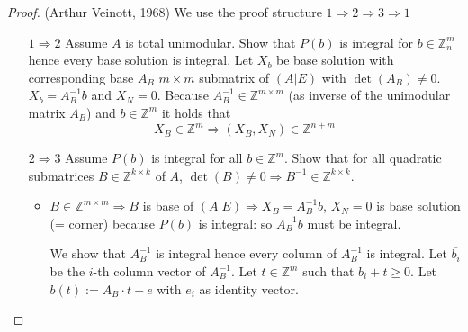 \documentclass[a4paper]{article}
\theoremstyle{definition}
\begin{document}
\begin{proof}
  (Arthur Veinott, 1968)
  We use the proof structure $1 \Rightarrow 2 \Rightarrow 3 \Rightarrow 1$

  \begin{itemize}
    \item[$1 \Rightarrow 2$]
      Assume $A$ is total unimodular. Show that $P(b)$ is integral for $b \in \mathbb{Z}^m_n$ hence every base solution is integral. Let $X_b$ be base solution with corresponding base $A_B$ $m \times m$ submatrix of $(A | E)$ with $\det(A_B) \neq 0$. $X_b = A_B^{-1}b$ and $X_N = 0$. Because $A_B^{-1} \in \mathbb{Z}^{m \times m}$ (as inverse of the unimodular matrix $A_B$) and $b \in \mathbb{Z}^m$ it holds that
      \[
        X_B \in \mathbb{Z}^m \Rightarrow (X_B, X_N) \in \mathbb{Z}^{n + m}
      \]
    \item[$2 \Rightarrow 3$]
      Assume $P(b)$ is integral for all $b \in \mathbb{Z}^m$.
      Show that for all quadratic submatrices $B \in \mathbb{Z}^{k\times k}$ of $A$, $\det(B) \neq 0 \Rightarrow B^{-1} \in \mathbb{Z}^{k\times k}$.
      \begin{itemize}
        \item
          $B \in \mathbb{Z}^{m\times m} \Rightarrow B$ is base of $(A | E) \Rightarrow X_B = A_B^{-1} b$, $X_N = 0$ is base solution (= corner) because $P(b)$ is integral: so $A_B^{-1} b$ must be integral.

          We show that $A_B^{-1}$ is integral hence every column of $A_B^{-1}$ is integral. Let $\overline{b_i}$ be the $i$-th column vector of $A_B^{-1}$. Let $t \in \mathbb{Z}^m$ such that $\overline{b_i} + t \geq 0$. Let $b(t) := A_B \cdot t + e$ with $e_i$ as identity vector.


\end{itemize}
\end{itemize}
\end{proof}
\end{document}
